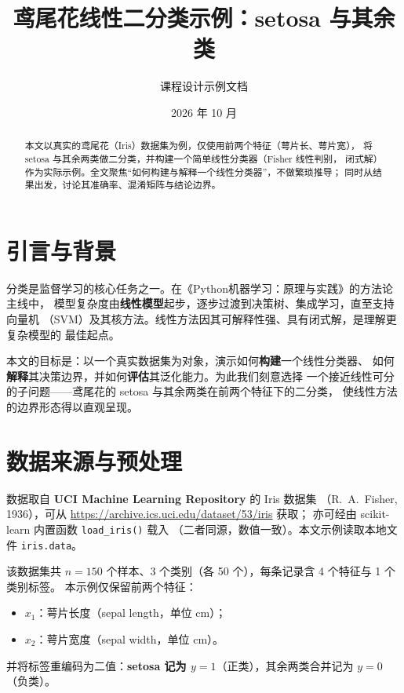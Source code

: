 \documentclass[UTF8, 11pt]{ctexart}
\title{\bfseries 鸢尾花线性二分类示例：setosa 与其余类}
\author{课程设计示例文档}
\date{2026 年 10 月}
\begin{document}
\maketitle

\begin{abstract}
本文以真实的鸢尾花（Iris）数据集为例，仅使用前两个特征（萼片长、萼片宽），
将 setosa 与其余两类做二分类，并构建一个简单线性分类器（Fisher 线性判别，
闭式解）作为实际示例。全文聚焦“如何构建与解释一个线性分类器”，不做繁琐推导；
同时从结果出发，讨论其准确率、混淆矩阵与结论边界。
\end{abstract}

\tableofcontents
\newpage

\section{引言与背景}
\label{sec:intro}

分类是监督学习的核心任务之一。在《Python机器学习：原理与实践》的方法论主线中，
模型复杂度由\textbf{线性模型}起步，逐步过渡到决策树、集成学习，直至支持向量机
（SVM）及其核方法。线性方法因其可解释性强、具有闭式解，是理解更复杂模型的
最佳起点。

本文的目标是：以一个真实数据集为对象，演示如何\textbf{构建}一个线性分类器、
如何\textbf{解释}其决策边界，并如何\textbf{评估}其泛化能力。为此我们刻意选择
一个接近线性可分的子问题——鸢尾花的 setosa 与其余两类在前两个特征下的二分类，
使线性方法的边界形态得以直观呈现。

\section{数据来源与预处理}
\label{sec:data}

数据取自 \textbf{UCI Machine Learning Repository} 的 Iris 数据集
（R.~A.~Fisher, 1936），可从
\url{https://archive.ics.uci.edu/dataset/53/iris} 获取；
亦可经由 scikit-learn 内置函数 \verb|load_iris()| 载入
（二者同源，数值一致）。本文示例读取本地文件 \verb|iris.data|。

该数据集共 $n=150$ 个样本、3 个类别（各 50 个），每条记录含 4 个特征与 1 个类别标签。
本示例仅保留前两个特征：
\begin{itemize}
  \item $x_1$：萼片长度（sepal length，单位 cm）；
  \item $x_2$：萼片宽度（sepal width，单位 cm）。
\end{itemize}
并将标签重编码为二值：\textbf{setosa 记为 $y=1$}（正类），其余两类合并记为 $y=0$（负类）。
\end{document}
